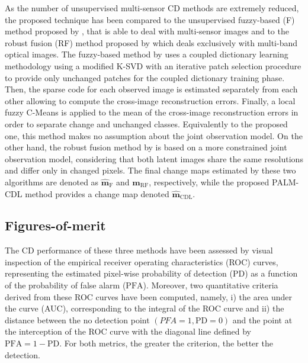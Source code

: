 \documentclass[review]{elsarticle}
\begin{document}
As the number of unsupervised multi-sensor CD methods are extremely reduced, the proposed technique has been compared to the unsupervised fuzzy-based (F) method proposed by \citet{gong_coupled_2016}, that is able to deal with multi-sensor images and to the robust fusion (RF) method proposed by \citet{ferraris_robust_2017} which deals exclusively with multi-band optical images. The fuzzy-based method by \citet{gong_coupled_2016} uses a coupled dictionary learning methodology using a modified K-SVD \citep{aharon_k-svd_2006} with an iterative patch selection procedure to provide only unchanged patches for the coupled dictionary training phase. Then, the sparse code for each observed image is estimated separately from each other allowing to compute the cross-image reconstruction errors. Finally, a local fuzzy C-Means is applied to the mean of the cross-image reconstruction errors in order to separate change and unchanged classes. Equivalently to the proposed one, this method makes no assumption about the joint observation model. On the other hand, the robust fusion method by \citet{ferraris_robust_2017} is based on a more constrained joint observation model, considering that both latent images share the same resolutions and differ only in changed pixels. The final change maps estimated by these two algorithms are denoted as $\hat{\mathbf{m}}_{\mathrm{F}}$ and  $\hat{\mathbf{m}}_{\mathrm{RF}}$, respectively, while the proposed PALM-CDL method provides a change map denoted $\hat{\mathbf{m}}_{\mathrm{CDL}}$.

\subsection{Figures-of-merit}
\label{subsec:figures_of_merit}
The CD performance of these three methods have been assessed by visual inspection of the empirical receiver operating characteristics (ROC) curves, representing the estimated pixel-wise probability of detection ($\mathrm{PD}$) as a function of the probability of false alarm ($\mathrm{PFA}$). Moreover, two quantitative criteria derived from these ROC curves have been computed, namely, i) the area under the curve (AUC), corresponding to the integral of the ROC curve and ii) the distance between the no detection point $(PFA = 1, \mathrm{PD} = 0)$ and the point at the interception of the ROC curve with the diagonal line defined by $\mathrm{PFA} = 1 - \mathrm{PD}$. For both metrics, the greater the criterion, the better the detection.
\end{document}
